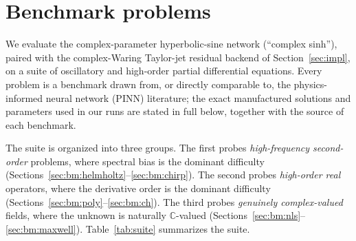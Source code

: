 %
%

\section{Benchmark problems}\label{sec:benchmarks}

We evaluate the complex-parameter hyperbolic-sine network (``complex sinh''),
paired with the complex-Waring Taylor-jet residual backend of
Section~\ref{sec:impl}, on a suite of oscillatory and high-order partial
differential equations. Every problem is a benchmark drawn from, or directly
comparable to, the physics-informed neural network (PINN) literature; the exact
manufactured solutions and parameters used in our runs are stated in full below,
together with the source of each benchmark.

The suite is organized into three groups. The first probes \emph{high-frequency
second-order} problems, where spectral bias is the dominant difficulty
(Sections~\ref{sec:bm:helmholtz}--\ref{sec:bm:chirp}). The second probes
\emph{high-order real} operators, where the derivative order is the dominant
difficulty (Sections~\ref{sec:bm:poly}--\ref{sec:bm:ch}). The third probes
\emph{genuinely complex-valued} fields, where the unknown is naturally
\(\mathbb{C}\)-valued (Sections~\ref{sec:bm:nls}--\ref{sec:bm:maxwell}).
Table~\ref{tab:suite} summarizes the suite.

